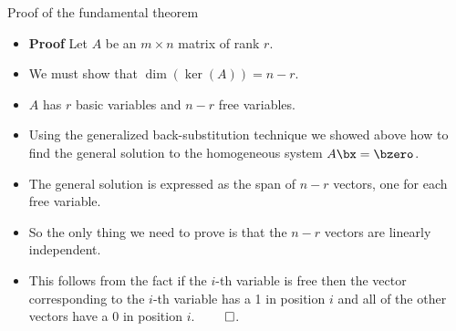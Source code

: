 \documentclass{beamer}
\begin{document}
\begin{frame}{Proof of the fundamental theorem}
\begin{itemize}
\item \textbf{Proof} Let $A$ be an $m\times n$ matrix of rank $r$.
\item We must show that $\dim(\ker(A)) = n -r$.
\item $A$ has $r$ basic variables and $n-r$  free variables.
\item Using the generalized back-substitution technique we showed above
how to find the general solution to the homogeneous system $A\bx=\bzero$.
\item The general solution is expressed as the span of $n-r$ vectors, one for
each free variable.
\item So the only thing we need to prove is that the $n-r$ vectors are
linearly independent.
\item This follows from the fact if the $i$-th variable is free then the
vector corresponding to the $i$-th variable has a 1 in position $i$ and all
of the other vectors have a 0 in position $i$. $\qed$.
\end{itemize}
\end{frame}
\end{document}
